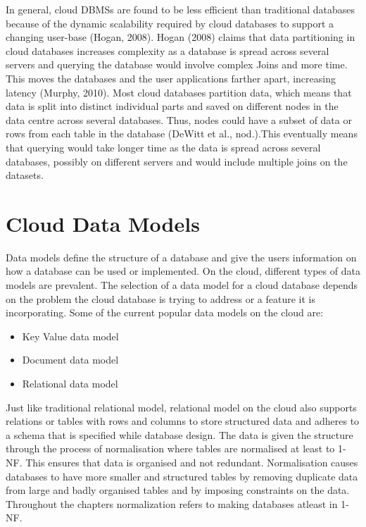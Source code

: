 In general, cloud \acp{DBMS} are found to be less efficient than traditional
databases because of the dynamic scalability required by cloud databases to
support a changing user-base (Hogan, 2008). Hogan (2008) claims that data
partitioning in cloud databases increases complexity as a database is spread
across several servers and querying the database would involve complex Joins and
more time. This moves the databases and the user applications farther apart,
increasing latency (Murphy, 2010). Most cloud databases partition data, which
means that data is split into distinct individual parts and saved on different
nodes in the data centre across several databases. Thus, nodes could have a
subset of data or rows from each table in the database (DeWitt et al.,
nod.).This eventually means that querying would take longer time as the data is
spread across several databases, possibly on different servers and would include
multiple joins on the datasets.
	
	
\section{Cloud Data Models}\label{s:cloud-data-models}
Data models define the structure of a database and give the users information on
how a database can be used or implemented. On the cloud, different types of data
models are prevalent. The selection of a data model for a cloud database depends
on the problem the cloud database is trying to address or a feature it is
incorporating. Some of the current popular data models on the cloud are:

\begin{itemize}
\item Key Value data model 

\item Document data model 

\item Relational data model
\end{itemize}

Just like traditional relational model, relational model on the cloud also
supports relations or tables with rows and columns to store structured data and
adheres to a schema that is specified while database design. The data is given
the structure through the process of normalisation where tables are normalised
at least to \ac{1-NF}. This ensures that data is organised and
not redundant. Normalisation causes databases to have more smaller and structured
tables by removing duplicate data from large and badly organised tables and by
imposing constraints on the data. Throughout the chapters normalization refers
to making databases atleast in \ac{1-NF}.

